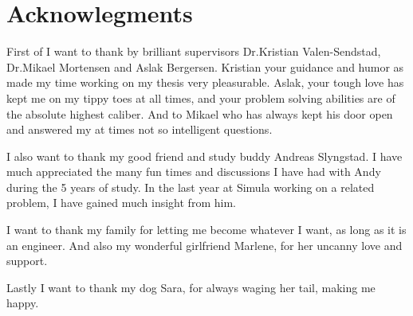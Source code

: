 \section*{Acknowlegments}
First of I want to thank by brilliant supervisors Dr.Kristian Valen-Sendstad, Dr.Mikael Mortensen and Aslak Bergersen. Kristian your guidance and humor as made my time working on my thesis very pleasurable. Aslak, your tough love has kept me on my tippy toes at all times, and your problem solving abilities are of the absolute highest caliber. And to Mikael who has always kept his door open and answered my at times not so intelligent questions.

I also want to thank my good friend and study buddy Andreas Slyngstad. I have much appreciated the many fun times and discussions I have had with Andy during the 5 years of study. In the last year at Simula working on a related problem, I have gained much insight from him.							
				
I want to thank my family for letting me become whatever I want, as long as it is an engineer. And also my wonderful girlfriend Marlene, for her uncanny love and support.

Lastly I want to thank my dog Sara, for always waging her tail, making me happy.